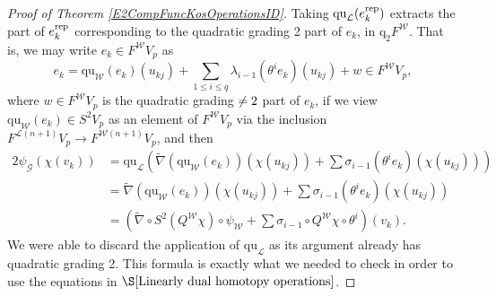 \documentclass[11pt]{amsart} \renewcommand{\baselinestretch}{1.2}
\theoremstyle{plain}
\numberwithin{equation}{section} %
\theoremstyle{plain}
\numberwithin{equation}{chapter} %
\renewcommand{\to}{\longrightarrow}
\newcommand{\scrG}{\mathscr{G}}
\newcommand{\calL}{\mathcal{L}}
\newcommand{\calw}{\mathcal{W}}
\newcommand{\call}{\mathcal{L}}
\newcommand{\BSW}{{\scrG}}
\newcommand{\quadratic}{\mathrm{qu}}
\newcommand{\quadgrad}[1]{\mathrm{q}_{#1}}
\begin{document}
\begin{Operations in composite functor spectral sequences}
\begin{proof}[Proof of Theorem \ref{E2CompFuncKosOperationsID}]
Taking $\quadratic_{\call}(e_{k}^\textup{rep})$ extracts the part of $e_{k}^\textup{rep}$ corresponding to the quadratic grading 2 part of $e_{k}$, in $\quadgrad{2}F^{\calw}$. That is, we may write $e_{k}\in F^{\calw}V_p$ as
\[e_{k}=\quadratic_{\calw}(e_k)(u_{kj})+\textstyle\sum_{1\leq i\leq q} \lambda_{i-1}(\theta^ie_k)(u_{kj}) + w\in F^{\calw}V_p,\]
where $w\in F^{\calw}V_p$ is the quadratic grading$\makebox[0cm][l]{}\neq2$ part of $e_{k}$, if we view $\quadratic_{\calw}(e_k)\in S^2V_p$ as an element of $F^{\calw}V_p$ via the inclusion $F^{\calL(n+1)}V_p\to F^{\calw(n+1)}V_p$, and then
\begin{alignat*}{2}
\psi_\BSW(\chi(v_k))&=\quadratic_{\calL} \left(\widetilde{\nabla}(\quadratic_{\calw}(e_k))(\chi(u_{kj}))+\sum \sigma_{i-1}(\theta^ie_k)(\chi(u_{kj}))\right)\\
&=\widetilde{\nabla}(\quadratic_{\calw}(e_k))(\chi(u_{kj}))+\sum \sigma_{i-1}(\theta^ie_k)(\chi(u_{kj}))\\
&=\left(\widetilde{\nabla}\circ S^2(Q^{\calw}\chi)\circ \psi_{\calw}+\sum\sigma_{i-1}\circ Q^{\calw}\chi\circ\theta^i\right)(v_k).
\end{alignat*}
We were able to discard the application of $\quadratic_{\calL}$ as its argument already has quadratic grading 2. This formula is exactly what we needed to check in order to use the equations in $\S\ref{Linearly dual homotopy operations}$.
\end{proof}


\end{Operations in composite functor spectral sequences}
\end{document}
